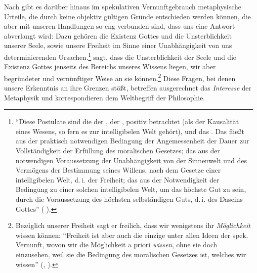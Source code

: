 \begin{nummerierung}
Nach  gibt es darüber hinaus im spekulativen
Vernunftgebrauch metaphysische Urteile, die durch keine objektiv gültigen Gründe
entschieden werden können, die aber mit unseren Handlungen so eng verbunden
sind, dass uns eine Antwort abverlangt wird: Dazu gehören die Existenz Gottes
und die Unsterblichkeit unserer Seele, sowie unsere Freiheit im Sinne einer
Unabhängigkeit von uns determinierenden Ursachen.\footnote{\enquote{Diese
Postulate sind die der , der , positiv
betrachtet (als der Kausalität eines Wesens, so fern es zur intelligibelen Welt
gehört), und das . Das  fließt aus der praktisch
notwendigen Bedingung der Angemessenheit der Dauer zur Vollständigkeit der
Erfüllung des moralischen Gesetzes; das  aus der notwendigen
Voraussetzung der Unabhängigkeit von der Sinnenwelt und des Vermögens der
Bestimmung seines Willens, nach dem Gesetze einer intelligibelen Welt, d.\,i.
der Freiheit; das  aus der Notwendigkeit der Bedingung zu einer
solchen intelligibelen Welt, um das höchste Gut zu sein, durch die Voraussetzung
des höchsten selbständigen Guts, d.\,i. des Daseins Gottes}
\mkbibparens{\cite[][A 238\,f.,]{Kant:KritikderpraktischenVernunft1974}
\cite[][V: 132.19--29]{Kant:GesammelteWerke1900ff.}}.}
 sagt, dass die Unsterblichkeit der Seele und die Existenz
Gottes jenseits des Bereichs unseres Wissens liegen, wir aber begründeter und
vernünftiger Weise an sie  können.\footnote{Bezüglich
unserer Freiheit sagt er freilich, dass wir wenigstens ihr \emph{Möglichkeit}
wissen können: \enquote{Freiheit ist aber auch die einzige unter allen Ideen
der spek. Vernunft, wovon wir die Möglichkeit a priori \emph{wissen}, ohne sie
doch einzusehen, weil sie die Bedingung des moralischen Gesetzes ist, welches
wir wissen} \mkbibparens{\cite[][A 5]{Kant:KritikderpraktischenVernunft1974},
\cite[][V: 4.7--10]{Kant:GesammelteWerke1900ff.}}.} Diese Fragen, bei denen
unsere Erkenntnis an ihre Grenzen stößt, betreffen ausgerechnet das
\emph{Interesse} der Metaphysik und korrespondieren dem Weltbegriff der
Philosophie.


\end{nummerierung}

